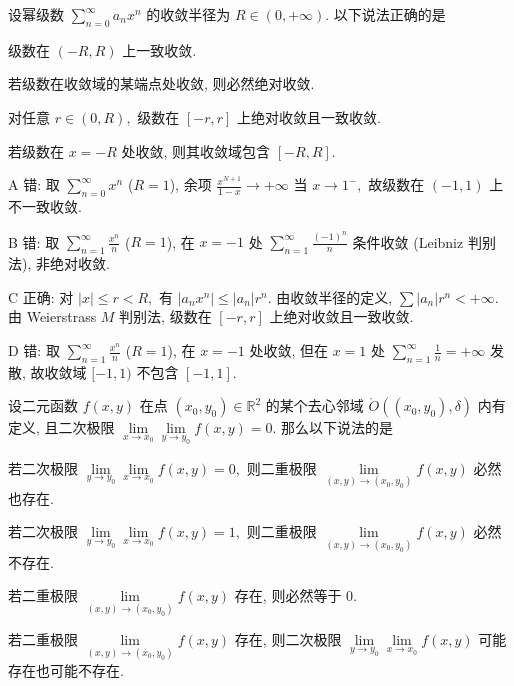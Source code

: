 \begin{question}
设幂级数 $\displaystyle\sum_{n=0}^\infty a_n x^n$ 的收敛半径为 $R \in (0, +\infty).$ 以下说法正确的是 \paren[C]

\begin{choices}
\item 级数在 $(-R, R)$ 上一致收敛.
\item 若级数在收敛域的某端点处收敛, 则必然绝对收敛.
\item 对任意 $r \in (0, R),$ 级数在 $[-r, r]$ 上绝对收敛且一致收敛.
\item 若级数在 $x = -R$ 处收敛, 则其收敛域包含 $[-R, R].$
\end{choices}
\end{question}

\begin{solution}
A 错: 取 $\sum_{n=0}^\infty x^n$ ($R = 1$), 余项 $\displaystyle\frac{x^{N+1}}{1-x} \to +\infty$ 当 $x \to 1^-,$ 故级数在 $(-1, 1)$ 上不一致收敛.

B 错: 取 $\displaystyle\sum_{n=1}^\infty \frac{x^n}{n}$ ($R = 1$), 在 $x = -1$ 处 $\displaystyle\sum_{n=1}^\infty \frac{(-1)^n}{n}$ 条件收敛 (Leibniz 判别法), 非绝对收敛.

C 正确: 对 $|x| \leqslant r < R,$ 有 $|a_n x^n| \leqslant |a_n| r^n.$ 由收敛半径的定义, $\sum |a_n| r^n < +\infty.$ 由 Weierstrass $M$ 判别法, 级数在 $[-r, r]$ 上绝对收敛且一致收敛.

D 错: 取 $\displaystyle\sum_{n=1}^\infty \frac{x^n}{n}$ ($R = 1$), 在 $x = -1$ 处收敛, 但在 $x = 1$ 处 $\displaystyle\sum_{n=1}^\infty \frac{1}{n} = +\infty$ 发散, 故收敛域 $[-1, 1)$ 不包含 $[-1, 1].$
\end{solution}

\begin{question}
设二元函数 $f(x, y)$ 在点 $(x_0, y_0) \in \mathbb{R}^2$ 的某个去心邻域 $\mathring{O}((x_0, y_0), \delta)$ 内有定义, 且二次极限 $\lim\limits_{x \to x_0} \lim\limits_{y \to y_0} f(x,y) = 0.$ 那么以下说法的是 \paren[A]

\begin{choices}
\item 若二次极限 $\lim\limits_{y \to y_0} \lim\limits_{x \to x_0} f(x,y) = 0,$ 则二重极限 $\lim\limits_{(x,y)\to(x_0,y_0)} f(x,y)$ 必然也存在.
\item 若二次极限 $\lim\limits_{y \to y_0} \lim\limits_{x \to x_0} f(x,y) = 1,$ 则二重极限 $\lim\limits_{(x,y)\to(x_0,y_0)} f(x,y)$ 必然不存在.
\item 若二重极限 $\lim\limits_{(x,y)\to(x_0,y_0)} f(x,y)$ 存在, 则必然等于 $0.$
\item 若二重极限 $\lim\limits_{(x,y)\to(x_0,y_0)} f(x,y)$ 存在, 则二次极限 $\lim\limits_{y \to y_0} \lim\limits_{x \to x_0} f(x,y)$ 可能存在也可能不存在.
\end{choices}
\end{question}

